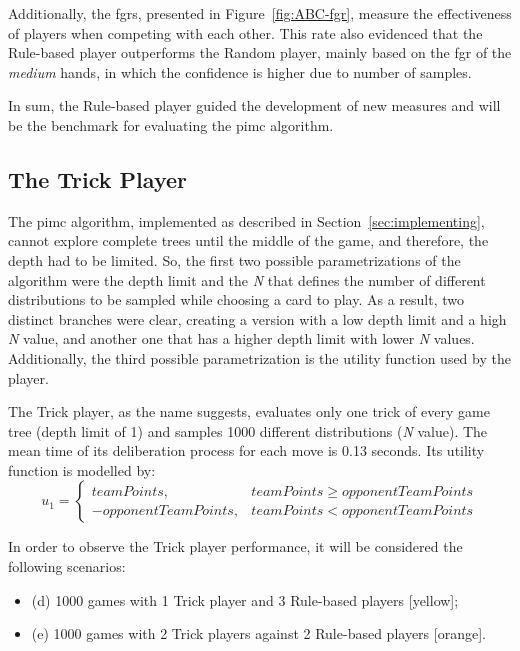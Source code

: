 Additionally, the \acp{fgr}, presented in Figure~\ref{fig:ABC-fgr}, measure the effectiveness of players when competing with each other.
This rate also evidenced that the Rule-based player outperforms the Random player, mainly based on the \ac{fgr} of the \emph{medium} hands, in which the confidence is higher due to number of samples.

In sum, the Rule-based player guided the development of new measures and will be the benchmark for evaluating the \ac{pimc} algorithm.


\subsection{The Trick Player}

The \ac{pimc} algorithm, implemented as described in Section~\ref{sec:implementing}, cannot explore complete trees until the middle of the game, and therefore, the depth had to be limited.
So, the first two possible parametrizations of the algorithm were the depth limit and the \emph{N} that defines the number of different distributions to be sampled while choosing a card to play.
As a result, two distinct branches were clear, creating a version with a low depth limit and a high \emph{N} value, and another one that has a higher depth limit with lower \emph{N} values.
Additionally, the third possible parametrization is the utility function used by the player.

The Trick player, as the name suggests, evaluates only one trick of every game tree (depth limit of 1) and samples 1000 different distributions (\emph{N} value).
The mean time of its deliberation process for each move is 0.13 seconds.
Its utility function is modelled by:
\begin{equation} \label{eq:uf1}
u_1 = \left\{
                \begin{array}{ll}
                  teamPoints, & teamPoints \geq opponentTeamPoints\\
                  - opponentTeamPoints, & teamPoints < opponentTeamPoints
                \end{array}
              \right.
\end{equation}

In order to observe the Trick player performance, it will be considered the following scenarios:
\begin{itemize}
\item (d) 1000 games with 1 Trick player and 3 Rule-based players [yellow];
\item (e) 1000 games with 2 Trick players against 2 Rule-based players [orange].
\end{itemize}

